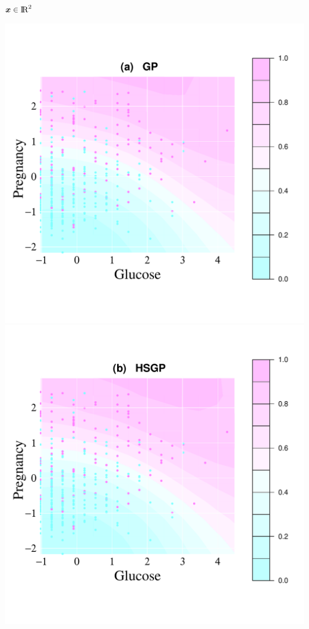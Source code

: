 \documentclass[8pt]{beamer} %
\begin{document}
\begin{frame}[t]
\vspace{5mm}
{\small $\bm{x} \in {\rm I\!R}^2$}\\[-20mm]
%
\begin{center}
\includegraphics[scale=0.27, trim = 5mm 23mm 39mm 20mm, clip]{ch5_fig18_gpfun_diabetes.pdf}
\includegraphics[scale=0.27, trim = 20mm 23mm 39mm 20mm, clip]{ch5_fig18_bffun_diabetes.pdf}

\end{center}
\end{frame}
\end{document}
